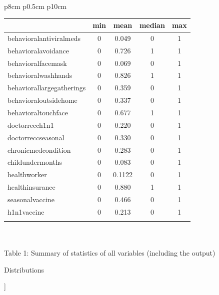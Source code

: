 \documentclass{IEEEtran}
\begin{document}
\begin{@twocolumnfalse}
\begin{center}
{\begin{tabular}{p{8cm} p{0.5cm} p{10cm}}
\begin{tabular}{| l |c|c|c|c|} %
\hline 
& \textbf{min} & \textbf{mean} & \textbf{median} & \textbf{max} \\
\hline 
behavioral\textunderscore antiviral\textunderscore meds & 0 & 0.049 & 0 & 1\\
\hline
behavioral\textunderscore avoidance & 0 & 0.726 & 1 & 1\\
\hline 
behavioral\textunderscore face\textunderscore mask & 0 & 0.069 & 0 & 1\\
\hline 
behavioral\textunderscore wash\textunderscore hands & 0 & 0.826 & 1 & 1\\
\hline 
behavioral\textunderscore large\textunderscore gatherings & 0 & 0.359 & 0 & 1\\
\hline
behavioral\textunderscore outside\textunderscore home & 0 & 0.337 & 0 & 1\\
\hline 
behavioral\textunderscore touch\textunderscore face & 0 & 0.677 & 1 & 1\\
\hline 
doctor\textunderscore recc\textunderscore h1n1 & 0 & 0.220 & 0 & 1\\
\hline 
doctor\textunderscore recc\textunderscore seasonal & 0 & 0.330 & 0 & 1\\
\hline 
chronic\textunderscore med\textunderscore condition & 0 & 0.283 & 0 & 1\\
\hline 
child\textunderscore under\textunderscore 6\textunderscore months & 0 & 0.083 & 0 & 1\\
\hline
health\textunderscore worker & 0 & 0.1122 & 0 & 1\\
\hline
health\textunderscore insurance & 0 & 0.880 & 1 & 1\\
\hline
seasonal\textunderscore vaccine & 0 & 0.466 & 0 & 1\\
\hline
h1n1\textunderscore vaccine & 0 & 0.213 & 0 & 1\\
\hline
\multicolumn{4}{l}{}\\
\end{tabular}

\end{tabular}%
}
\quad \\
\quad \\
{Table 1: Summary of statistics of all variables (including the output)}
\end{center}
{\huge Distributions}
\end{@twocolumnfalse}
]
\end{document}
